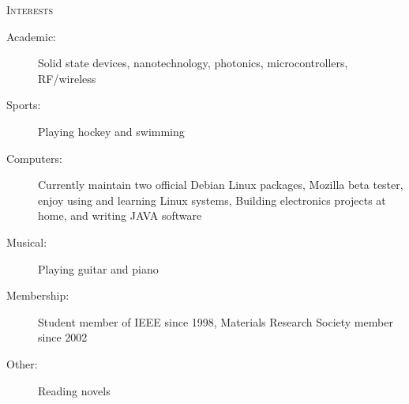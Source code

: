 \documentclass[letterpaper,11pt]{article}
\newcommand{\resheading}[1]{
  \begin{tcolorbox}
  \textsc{#1}
  \end{tcolorbox}
}
\begin{document}
\resheading{Interests}

\begin{description}
\item[Academic:] Solid state devices,  nanotechnology, photonics, microcontrollers, RF/wireless
\item[Sports:] Playing hockey and swimming
\item[Computers:] Currently maintain two official Debian Linux packages, Mozilla beta tester, enjoy using and learning Linux systems, Building electronics projects at home, and writing JAVA software
\item[Musical:] Playing guitar and piano
\item[Membership:] Student member of IEEE since 1998, Materials Research Society member since 2002
\item[Other:] Reading novels
\end{description}
\end{document}

